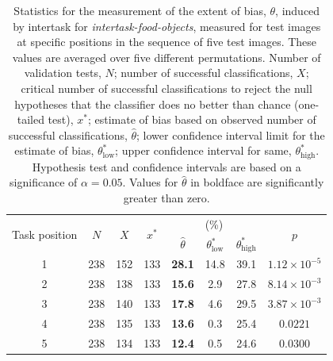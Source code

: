 \documentclass[12pt]{article}
\begin{document}
\begin{table}
\begin{center}
\begin{tabular}{c c c c c c c c }
	\toprule
	\multirow{2}{*}{Task position} & \multirow{2}{*}{$N$} & 
	\multirow{2}{*}{$X$} & \multirow{2}{*}{$x^*$} & \multicolumn{3}{c}{(\%)}
		& \multirow{2}{*}{$p$}\\ \cline{5-7}\noalign{\smallskip}
	& & & & $\hat{\theta}$ & $\theta^*_\mathrm{low}$ 
		& $\theta^*_\mathrm{high}$  \\
	\midrule
	1 & 238 & 152 & 133 & \textbf{28.1} & 14.8 & 39.1 
		& $1.12 \times 10^{-5}$\\
	2 & 238 & 138 & 133 & \textbf{15.6} & 2.9 & 27.8  
		& $8.14 \times 10^{-3}$\\
	3 & 238 & 140 & 133 & \textbf{17.8} & 4.6 & 29.5  
		& $3.87 \times 10^{-3}$\\
	4 & 238 & 135 & 133 & \textbf{13.6} & 0.3 & 25.4  
		& $0.0221$ \\
	5 & 238 & 134 & 133 & \textbf{12.4} & 0.5 & 24.6 & $0.0300$ \\
	\bottomrule
\end{tabular}
\caption{Statistics for the measurement of the extent of bias, $\theta$,
	induced by intertask for \textit{intertask-food-objects}, measured 
	for test images at specific positions in the sequence of five test images.
	These values are averaged over five different permutations.
	Number of validation tests, $N$; number of successful classifications, 
	$X$; critical number of successful classifications to reject the null 
	hypotheses that the classifier does no better than chance 
	(one-tailed test), $x^*$; 
	estimate of bias based on observed number of successful
	classifications, $\hat{\theta}$; lower confidence interval limit
	for the estimate of bias, $\theta^*_\mathrm{low}$; upper confidence 
	interval for same, $\theta^*_\mathrm{high}$.  Hypothesis test and 
	confidence intervals are based on a significance of $\alpha=0.05$.
	Values for $\hat{\theta}$ in boldface are significantly greater than zero.
}
\label{table:theta_pos}
\end{center}
\end{table}
\end{document}

